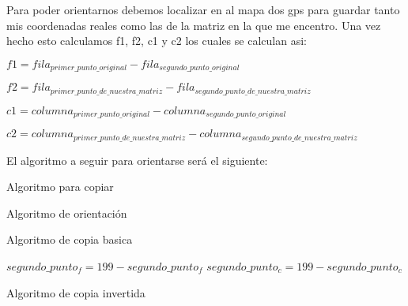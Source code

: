 \documentclass[10pt,a4paper,spanish]{article}
\begin{document}
Para poder orientarnos debemos localizar en al mapa dos gps para guardar tanto mis coordenadas reales como las de la matriz en la que me encentro. Una vez hecho esto calculamos f1, f2, c1 y c2 los cuales se calculan asi:

$f1 = fila_{primer\_punto\_original} - fila_{segundo\_punto\_original}$

$f2 = fila_{primer\_punto\_de\_nuestra\_matriz} - fila_{segundo\_punto\_de\_nuestra\_matriz}$

$c1 = columna_{primer\_punto\_original} - columna_{segundo\_punto\_original}$

$c2 = columna_{primer\_punto\_de\_nuestra\_matriz} - columna_{segundo\_punto\_de\_nuestra\_matriz}$


El algoritmo a seguir para orientarse será el siguiente:


\begin{algorithm}[H]
\SetAlgoLined


Algoritmo para copiar

\caption{Algoritmo de orientación}
\end{algorithm}

\bigskip
\bigskip

\begin{algorithm}[H]
\SetAlgoLined
{}
\caption{Algoritmo de copia basica}
\end{algorithm}

\bigskip
\bigskip

\begin{algorithm}[H]
\SetAlgoLined

$segundo\_punto_f = 199 - segundo\_punto_f$\;
$segundo\_punto_c = 199 - segundo\_punto_c$\;

\caption{Algoritmo de copia invertida}
\end{algorithm}

\bigskip
\bigskip
\end{document}
